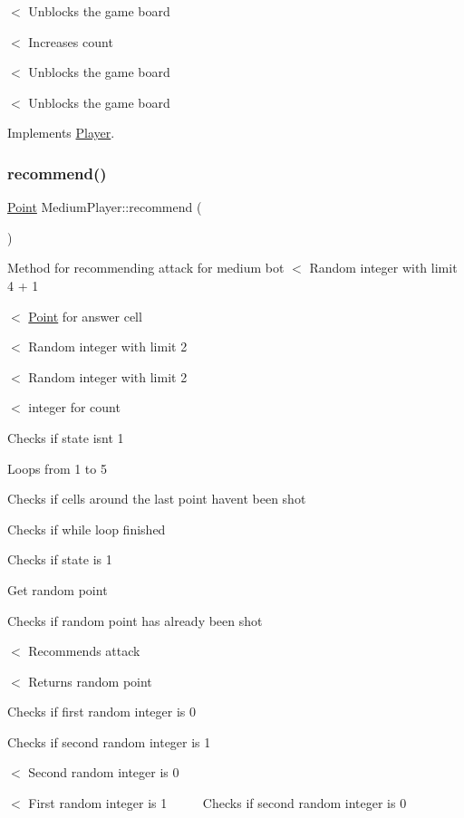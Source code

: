 $<$ Unblocks the game board

$<$ Increases count

$<$ Unblocks the game board

$<$ Unblocks the game board 

Implements \mbox{\hyperlink{class_player_ab89c1180c7314d3e19bcf4b2bed2e02a}{Player}}.

\mbox{\label{class_medium_player_a2e99d57f30f3f7f929840b8cda16527d}} 
\subsubsection{\texorpdfstring{recommend()}{recommend()}}
{\footnotesize\ttfamily \mbox{\hyperlink{class_point}{Point}} Medium\+Player\+::recommend (\begin{DoxyParamCaption}{ }\end{DoxyParamCaption})\hspace{0.3cm}{\ttfamily [virtual]}}

Method for recommending attack for medium bot $<$ Random integer with limit 4 + 1

$<$ \mbox{\hyperlink{class_point}{Point}} for answer cell

$<$ Random integer with limit 2

$<$ Random integer with limit 2

$<$ integer for count

Checks if state isn\textquotesingle{}t 1

Loops from 1 to 5

Checks if cells around the last point haven\textquotesingle{}t been shot

Checks if while loop finished

Checks if state is 1

Get random point

Checks if random point has already been shot

$<$ Recommends attack

$<$ Returns random point

Checks if first random integer is 0

Checks if second random integer is 1

$<$ Second random integer is 0

$<$ First random integer is 1 ~\newline
~\newline
~\newline
 Checks if second random integer is 0


